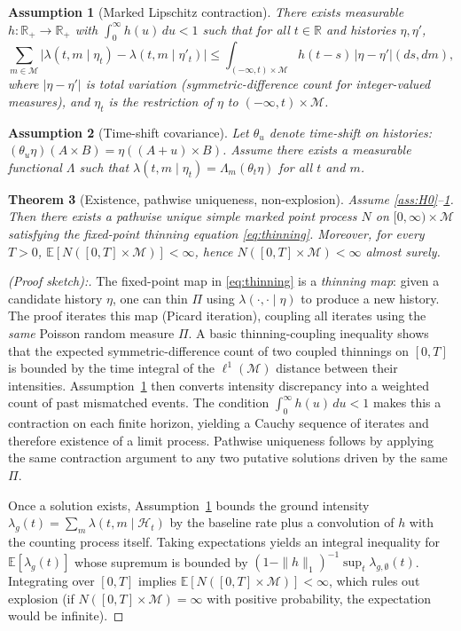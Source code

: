 \documentclass[12pt]{article}
\newtheorem{theorem}{Theorem}[section]
\newtheorem{assumption}[theorem]{Assumption}
\begin{document}
\begin{assumption}[Marked Lipschitz contraction]\label{ass:HL}
There exists measurable $h:\mathbb R_+\to\mathbb R_+$ with $\int_0^\infty h(u)\,du<1$ such that for all $t\in\mathbb R$ and histories $\eta,\eta'$,
\[
\sum_{m\in\mathcal M}\bigl|\lambda(t,m\mid\eta_t)-\lambda(t,m\mid\eta'_t)\bigr|
\le
\int_{(-\infty,t)\times\mathcal M} h(t-s)\,|\eta-\eta'|(ds,dm),
\]
where $|\eta-\eta'|$ is total variation (symmetric-difference count for integer-valued measures), and $\eta_t$ is the restriction of $\eta$ to $(-\infty,t)\times\mathcal M$.
\end{assumption}

\begin{assumption}[Time-shift covariance]\label{ass:shift}
Let $\theta_u$ denote time-shift on histories: $(\theta_u\eta)(A\times B)=\eta((A+u)\times B)$. Assume there exists a measurable functional $\Lambda$ such that $\lambda(t,m\mid\eta_t)=\Lambda_m(\theta_t\eta)$ for all $t$ and $m$.
\end{assumption}

\begin{theorem}[Existence, pathwise uniqueness, non-explosion]\label{thm:existence}
Assume \ref{ass:H0}--\ref{ass:HL}. Then there exists a pathwise unique simple marked point process $N$ on $[0,\infty)\times\mathcal M$ satisfying the fixed-point thinning equation \eqref{eq:thinning}. Moreover, for every $T>0$, $\mathbb E[N([0,T]\times\mathcal M)]<\infty$, hence $N([0,T]\times\mathcal M)<\infty$ almost surely.
\end{theorem}

\begin{proof}[(Proof sketch):] The fixed-point map in \eqref{eq:thinning} is a \emph{thinning map}: given a candidate history $\eta$, one can thin $\Pi$ using $\lambda(\cdot,\cdot\mid \eta)$ to produce a new history. The proof iterates this map (Picard iteration), coupling all iterates using the \emph{same} Poisson random measure $\Pi$. A basic thinning-coupling inequality shows that the expected symmetric-difference count of two coupled thinnings on $[0,T]$ is bounded by the time integral of the $\ell^1(\mathcal M)$ distance between their intensities. Assumption~\ref{ass:HL} then converts intensity discrepancy into a weighted count of past mismatched events. The condition $\int_0^\infty h(u)\,du<1$ makes this a contraction on each finite horizon, yielding a Cauchy sequence of iterates and therefore existence of a limit process. Pathwise uniqueness follows by applying the same contraction argument to any two putative solutions driven by the same $\Pi$. 

Once a solution exists, Assumption~\ref{ass:HL} bounds the ground intensity $\lambda_g(t)=\sum_m \lambda(t,m\mid\mathcal H_t)$ by the baseline rate plus a convolution of $h$ with the counting process itself. Taking expectations yields an integral inequality for $\mathbb E[\lambda_g(t)]$ whose supremum is bounded by $(1-\|h\|_1)^{-1}\sup_t \lambda_{g,\emptyset}(t)$. Integrating over $[0,T]$ implies $\mathbb E[N([0,T]\times\mathcal M)]<\infty$, which rules out explosion (if $N([0,T]\times\mathcal M)=\infty$ with positive probability, the expectation would be infinite).\end{proof}
\end{document}
